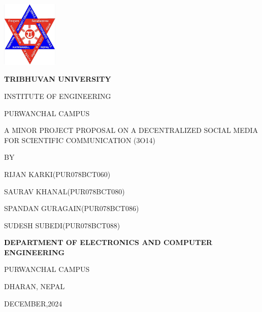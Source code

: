 \begin{titlepage}
    \centering
    
    \includegraphics[width=0.2\textwidth]{Graphics/TULogo.png}\par
    \vspace{1.2cm}
    {\fontsize{14pt}{12pt}\selectfont\bfseries\textcolor{black}
    TRIBHUVAN UNIVERSITY \par INSTITUTE OF ENGINEERING \par PURWANCHAL CAMPUS \par
    \vspace{1.2cm}
    \begin{flushleft}
    
    \end{flushleft}

    \par A MINOR PROJECT PROPOSAL ON A DECENTRALIZED SOCIAL MEDIA FOR SCIENTIFIC COMMUNICATION (3O14)\par

    \vspace{1.2cm}
    BY\par RIJAN KARKI(PUR078BCT060)
      \par SAURAV KHANAL(PUR078BCT080)
      \par SPANDAN GURAGAIN(PUR078BCT086)
      \par SUDESH SUBEDI(PUR078BCT088)
    \vspace{1.2cm}\par
    }
    {\fontsize{13pt}{12pt}\selectfont\bfseries\textcolor{black}
    DEPARTMENT OF ELECTRONICS AND COMPUTER ENGINEERING\par PURWANCHAL CAMPUS\par DHARAN, NEPAL\par
    \vspace{1.2cm}
    \vspace{1.2cm}
    
    DECEMBER,2024 
    }
\end{titlepage}
